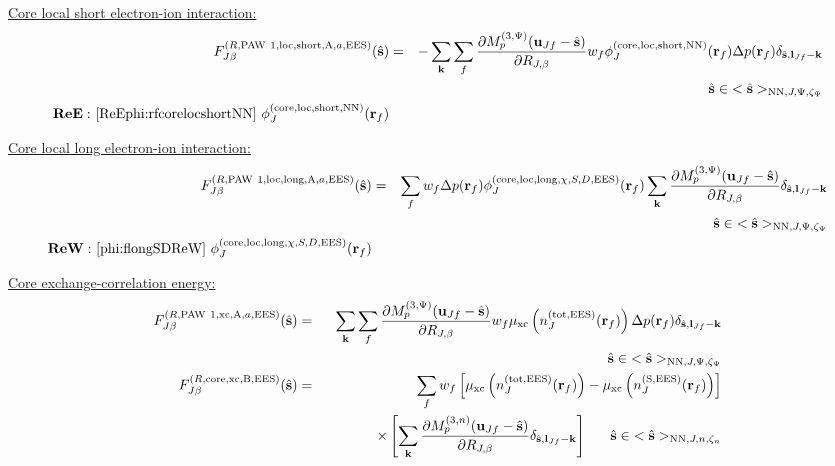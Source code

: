\documentclass[paper=a4, fontsize=11pt]{article} %
\numberwithin{equation}{section} %
\numberwithin{figure}{section} %
\numberwithin{table}{section} %
\newcommand{\p}{\partial}
\newcommand{\bu}{{\bf{u}}}
\newcommand{\bl}{{\bf{l}}}
\newcommand{\bk}{{\bf{k}}}
\newcommand{\bs}{{\bf{s}}}
\newcommand{\br}{{\bf{r}}}
\newcommand{\hs}{{\hat{\bf{s}}}}
\newcommand{\rS}{{\mathrm{S}}}
\newcommand{\rEES}{{\mathrm{EES}}}
\newcommand{\rxc}{{\mathrm{xc}}}
\newcommand{\rcore}{{\mathrm{core}}}
\newcommand{\rNN}{{\mathrm{NN}}}
\newcommand{\rshort}{{\mathrm{short}}}
\newcommand{\rlong}{{\mathrm{long}}}
\newcommand{\rP}{{\mathrm{PAW}}}
\newcommand{\rA}{{\mathrm{A}}}
\newcommand{\rB}{{\mathrm{B}}}
\newcommand{\rlo}{{\mathrm{loc}}}
\newcommand{\rtot}{{\mathrm{tot}}}
\newcommand{\RJb}{{R_{J,\beta}}}
\newcommand{\Mn}{{M_p^{(3,n)}}}
\newcommand{\Mp}{{M_p^{(3,\Psi)}}}
\newcommand{\hsJp}{{<\hs>_{\rNN,J,\Psi,\zeta_\Psi}}}
\newcommand{\hsJn}{{<\hs>_{\rNN,J,n,\zeta_n}}}
\newcommand{\hsinJp}{{\ \ \ \ \ \hs  \in  \hsJp}}
\newcommand{\hsinJn}{{\ \ \ \ \ \hs  \in  \hsJn}}
\newcommand{\ReE}{{{\bf ReE:\ }}}
\newcommand{\ReW}{{{\bf ReW:\ }}}
\begin{document}
\underline{Core local short electron-ion interaction:}
\begin{eqnarray}
\label{FJb:sRPAW1locshortAa}
F_{J\beta}^{(R,\rP\ 1,\rlo,\rshort,\rA,a,\rEES)}(\hs)
&=& -\sum_{\bk}\sum_f  \frac{\p \Mp(\bu_{Jf}-\hat \bs)}{\p \RJb}w_f \phi_J^{(\rcore,\rlo,\rshort,\rNN)}(\br_f)\Delta p(\br_f)\delta_{\hat \bs,\bl_{Jf}-\bk} \nonumber\\
&\ &\hspace*{2.3in} \hsinJp \\
\ReE \eqref{ReEphi:rfcorelocshortNN}\ \phi_J^{(\rcore,\rlo,\rshort,\rNN)}(\br_f) \nonumber 
\end{eqnarray}


\underline{Core local long electron-ion interaction:}
\begin{eqnarray}
\label{FJb:sRPAW1loclongAa}
F_{J\beta}^{(R,\rP\ 1,\rlo,\rlong,\rA,a,\rEES)}(\hs) &=& \sum_f w_f \Delta p(\br_f) \phi_J^{(\rcore,\rlo,\rlong,\chi,S,D,\rEES)}(\br_f) \sum_{\bk} \frac{\p \Mp(\bu_{Jf}-\hat \bs)}{\p \RJb} \delta_{\hat \bs,\bl_{Jf}-\bk}\nonumber\\
&\ &\hspace*{2.3in} \hsinJp \\
\ReW \eqref{phi:flongSDReW}\ \phi_J^{(\rcore,\rlo,\rlong,\chi,S,D,\rEES)}(\br_f)\nonumber
\end{eqnarray}

\underline{Core exchange-correlation energy:}
\begin{eqnarray}
\label{FJb:sRPAW1xcAa}
F_{J\beta}^{(R,\rP\ 1,\rxc,\rA,a,\rEES)}(\hs)
&=&\sum_{\bk}\sum_f  \frac{\p \Mp(\bu_{Jf}-\hat \bs)}{\p \RJb}w_f \mu_{\rxc} \left( n^{(\rtot,\rEES)}_J(\br_f)  \right)\Delta p(\br_f)\delta_{\hat \bs,\bl_{Jf}-\bk} \nonumber\\
&\ &\hspace*{2.5in} \hsinJp \\
\label{gr:FRxcB}
F_{J\beta}^{(R,\rcore,\rxc,\rB,\rEES)}(\hs)&=&\sum_f w_f \left[\mu_{\rxc} \left(  n^{(\rtot,\rEES)}_J(\br_f)  \right) - \mu_{\rxc} \left(  n^{(\rS,\rEES)}_J(\br_f)  \right) \right] \nonumber \\
&& \hspace*{0.5in} \times \left[\sum_{\bk} \frac{\p \Mn(\bu_{Jf}-\hat \bs)}{\p \RJb}\delta_{\hat \bs,\bl_{Jf}-\bk} \right]\hsinJn
\end{eqnarray}
\end{document}

